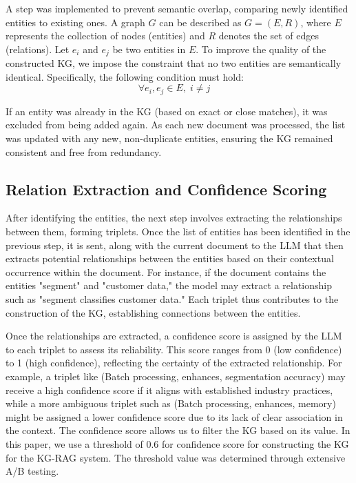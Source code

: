 A step was implemented to prevent semantic overlap, comparing newly identified entities to existing ones. A graph \( G \) can be described as \( G = (E, R) \), where \( E \) represents the collection of nodes (entities) and \( R \) denotes the set of edges (relations). Let \( e_i \) and \( e_j \) be two entities in \( E \). To improve the quality of the constructed KG, we impose the constraint that no two entities are semantically identical. Specifically, the following condition must hold:
 \vspace*{-1mm}
\begin{equation}
    \forall e_i, e_j \in E, \; i \neq j \quad 
    \label{overlap}
\end{equation}

If an entity was already in the KG (based on exact or close matches), it was excluded from being added again. As each new document was processed, the list was updated 
with any new, non-duplicate entities, ensuring the KG remained consistent and free from redundancy.

\subsection{Relation Extraction and Confidence Scoring}

After identifying the entities, the next step involves extracting the relationships between them, forming triplets. Once the list of entities has been identified in the previous step, it is sent, along with the current document to the LLM that then extracts potential relationships between the entities based on their contextual occurrence within the document. For instance, if the document contains the entities "segment" and "customer data," the model may extract a relationship such as "segment classifies customer data." Each triplet thus contributes to the construction of the KG, establishing connections between the entities.

Once the relationships are extracted, a confidence score is assigned by the LLM to each triplet to assess its reliability. This score ranges from 0 (low confidence) to 1 (high confidence), reflecting the certainty of the extracted relationship. For example, a triplet like (Batch processing, enhances, segmentation accuracy) may receive a high confidence score if it aligns with established industry practices, while a more ambiguous triplet such as (Batch processing, enhances, memory) might be assigned a lower confidence score due to its lack of clear association in the context. The confidence score allows us to filter the KG based on its value. In this paper, we use a threshold of 0.6 for confidence score for constructing the KG for the KG-RAG system. The threshold value was determined through extensive A/B testing.

